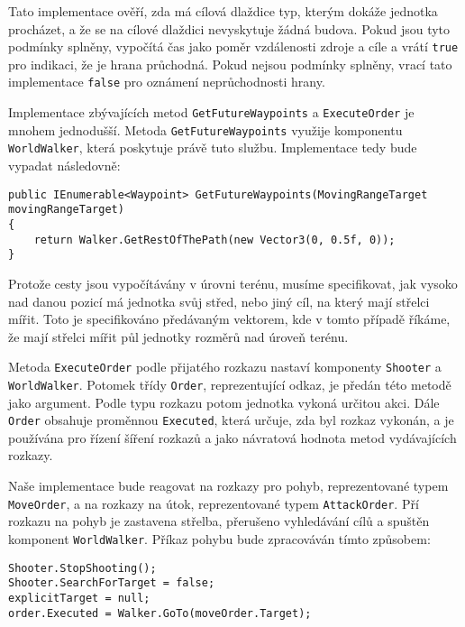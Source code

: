 Tato implementace ověří, zda má cílová dlaždice typ, kterým dokáže jednotka procházet, a že se na cílové dlaždici nevyskytuje žádná budova. Pokud jsou tyto podmínky splněny, vypočítá čas jako poměr vzdálenosti zdroje a cíle a vrátí \texttt{true} pro indikaci, že je hrana průchodná. Pokud nejsou podmínky splněny, vrací tato implementace \texttt{false} pro oznámení neprůchodnosti hrany.


Implementace zbývajících metod \texttt{GetFutureWaypoints} a \texttt{ExecuteOrder} je mnohem jednodušší. Metoda \texttt{GetFutureWaypoints} využije komponentu \texttt{WorldWalker}, která poskytuje právě tuto službu. Implementace tedy bude vypadat následovně:

\begin{lstlisting}
public IEnumerable<Waypoint> GetFutureWaypoints(MovingRangeTarget movingRangeTarget)
{
	return Walker.GetRestOfThePath(new Vector3(0, 0.5f, 0));
}
\end{lstlisting}

Protože cesty jsou vypočítávány v úrovni terénu, musíme specifikovat, jak vysoko nad danou pozicí má jednotka svůj střed, nebo jiný cíl, na který mají střelci mířit. Toto je specifikováno předávaným vektorem, kde v tomto případě říkáme, že mají střelci mířit půl jednotky rozměrů nad úroveň terénu.

Metoda \texttt{ExecuteOrder} podle přijatého rozkazu nastaví komponenty \texttt{Shooter} a \texttt{WorldWalker}. Potomek třídy \texttt{Order}, reprezentující odkaz, je předán této metodě jako argument. Podle typu rozkazu potom jednotka vykoná určitou akci. Dále \texttt{Order} obsahuje proměnnou \texttt{Executed}, která určuje, zda byl rozkaz vykonán, a je používána pro řízení šíření rozkazů a jako návratová hodnota metod vydávajících rozkazy. 

Naše implementace bude reagovat na rozkazy pro pohyb, reprezentované typem \texttt{MoveOrder}, a na rozkazy na útok, reprezentované typem \texttt{AttackOrder}. Pří rozkazu na pohyb je zastavena střelba, přerušeno vyhledávání cílů a spuštěn komponent \texttt{WorldWalker}. Příkaz pohybu bude zpracováván tímto způsobem:
\begin{lstlisting}
Shooter.StopShooting();
Shooter.SearchForTarget = false;
explicitTarget = null;
order.Executed = Walker.GoTo(moveOrder.Target);
\end{lstlisting}

